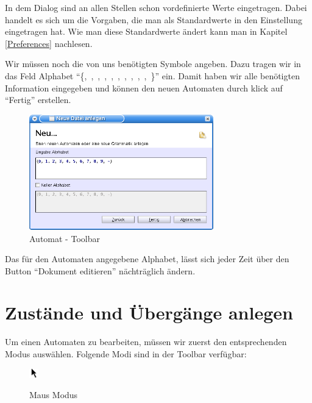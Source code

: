 In dem Dialog sind an allen Stellen schon vordefinierte Werte eingetragen. Dabei
handelt es sich um die Vorgaben, die man als Standardwerte in den Einstellung
eingetragen hat. Wie man diese Standardwerte ändert kann man in Kapitel
\ref{Preferences} nachlesen.\vspace{10pt}

Wir müssen noch die von uns benötigten Symbole angeben. Dazu tragen wir in das
Feld Alphabet "`\{,\ ,\ ,\ ,\
,\ ,\ ,\ ,\ ,\ ,\
\Symbol{-}\}"' ein. Damit haben wir alle benötigten Information eingegeben und
können den neuen Automaten durch klick auf "`Fertig"' erstellen.\vspace{10pt}
\vspace{10pt} 

\begin{figure}[h]
\begin{center}
\includegraphics[width=8cm]{images/new_dialog_machine.png}
\caption{Automat - Toolbar}
\end{center}
\end{figure}

Das für den Automaten angegebene Alphabet, lässt sich jeder Zeit über den Button
"`Dokument editieren"' nächträglich ändern.

\section{Zustände und Übergänge anlegen}

Um einen Automaten zu bearbeiten, müssen wir zuerst den entsprechenden Modus
auswählen. Folgende Modi sind in der Toolbar verfügbar:

\begin{figure}[h!]
  \begin{center}
    \begin{minipage}[t]{1cm}
      \includegraphics[width=0.4cm]{images/machineToolbar/mouse.png}
    \end{minipage}
    \begin{minipage}[t]{5cm}
      Maus Modus
    \end{minipage}
  \end{center}
\end{figure} 

